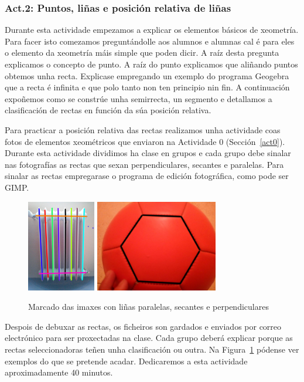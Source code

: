 \subsubsection{Act.2: Puntos, liñas e posición relativa de liñas}\label{act2}
Durante esta actividade empezamos a explicar os elementos básicos de xeometría. Para facer isto comezamos preguntándolle aos alumnos e alumnas cal é para eles o elemento da xeometría máis simple que poden dicir. A raíz desta pregunta explicamos o concepto de punto. A raíz do punto explicamos que aliñando puntos obtemos unha recta. Explicase empregando un exemplo do programa Geogebra que a recta é infinita e que polo tanto non ten principio nin fin. A continuación expoñemos como se constrúe unha semirrecta, un segmento e detallamos a clasificación de rectas en función da súa posición relativa.

Para practicar a posición relativa das rectas realizamos unha actividade coas fotos de elementos xeométricos que enviaron na Actividade 0 (Sección~\ref{act0}). Durante esta actividade dividimos ha clase en grupos e cada grupo debe sinalar nas fotografías as rectas que sexan perpendiculares, secantes e paralelas. Para sinalar as rectas empregarase o programa de edición fotográfica, como pode ser GIMP.

\begin{figure}[h!]
  \centering
  \includegraphics[height=4cm]{img/act1-img.jpg}
  \includegraphics[height=4cm]{img/act1-img2.jpg}
  \caption{Marcado das imaxes con liñas paralelas, secantes e perpendiculares}\label{fig:act2}
\end{figure}

Despois de debuxar as rectas, os ficheiros son gardados e enviados por correo electrónico para ser proxectadas na clase. Cada grupo deberá explicar porque as rectas seleccionadoras teñen unha clasificación ou outra. Na Figura~\ref{fig:act2} pódense ver exemplos do que se pretende acadar. Dedicaremos a esta actividade aproximadamente 40 minutos.


